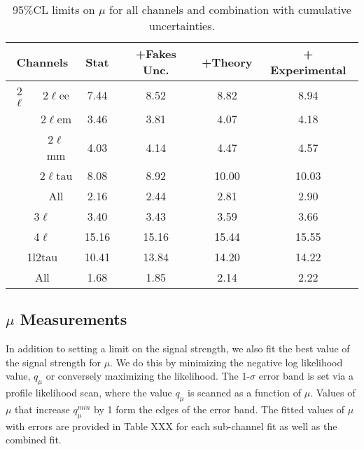 \begin{table}[htbp]
\begin{center}
\begin{tabular}{|c|c|c|c|c|c|}
\hline 
\multicolumn{2}{|c|}{ Channels} &  Stat &  +Fakes Unc.  & +Theory  & + Experimental\\ 
\hline 
2$\ell$       & 2$\ell$ee  & 7.44 & 8.52 & 8.82 &8.94 \\ 
         & 2$\ell$em   &3.46 & 3.81 & 4.07 &4.18 \\ 
        & 2$\ell$mm   & 4.03 & 4.14 & 4.47 &4.57 \\ 
        & 2$\ell$tau   &8.08 & 8.92 & 10.00 &10.03 \\ 
        &  All   & 2.16 & 2.44 & 2.81 &2.90 \\ 
\hline 
\multicolumn{2}{|c|}{ 3$\ell$ }  &3.40 & 3.43 & 3.59 &3.66 \\ 
\hline 
\multicolumn{2}{|c|}{ 4$\ell$ }  & 15.16 & 15.16 & 15.44 &15.55 \\ 
\hline 
\multicolumn{2}{|c|}{ 1l2tau }  & 10.41 & 13.84 & 14.20 &14.22 \\ 
\hline 
\multicolumn{2}{|c|}{ All } & 1.68 & 1.85 & 2.14 &2.22 \\ 
\hline 
\end{tabular} 
\caption{\label{table:results_cumulative} 95$\%$CL limits on $\mu$ for all channels and combination with cumulative uncertainties.}
\end{center} 
\end{table} 



\subsection{$\mu$ Measurements}

In addition to setting a limit on the signal strength, we also fit the best value of the signal strength for $\mu$. We do this by minimizing the negative log likelihood value, $q_{\mu}$ or conversely maximizing the likelihood. The 1-$\sigma$ error band is set via a profile likelihood scan, where the value $q_{\mu}$ is scanned as a function of $\mu$. Values of $\mu$ that increase $q^{min}_{\mu}$ by 1 form the edges of the error band. The fitted values of $\mu$ with errors are provided in Table XXX for each sub-channel fit as well as the combined fit. 

